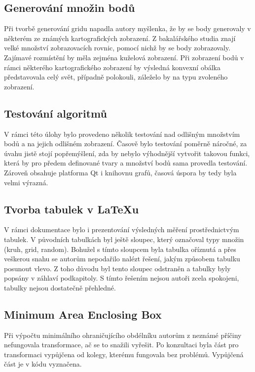 \documentclass[a4paper, 12pt]{article}
\begin{document}
\subsection{Generování množin bodů}
Při tvorbě generování gridu napadla autory myšlenka, že by se body generovaly v některém ze známých kartografických zobrazení. Z bakalářského studia znají velké množství zobrazovacích rovnic, pomocí nichž by se body zobrazovaly. Zajímavé rozmístění by měla zejména kuželová zobrazení. Při zobrazení bodů v rámci některého kartografického zobrazení by výsledná konvexní obálka představovala celý svět, případně polokouli, záleželo by na typu zvoleného zobrazení.

\subsection{Testování algoritmů}
V rámci této úlohy bylo provedeno několik testování nad odlišným množstvím bodů a na jejich odlišném zobrazení. Časově bylo testování poměrně náročné, za úvahu jistě stojí popřemýšlení, zda by nebylo výhodnější vytvořit takovou funkci, která by pro předem definované tvary a množství bodů sama provedla testování. Zároveň obsahuje platforma Qt i knihovnu grafů, časová úspora by tedy byla velmi výrazná.


\subsection{Tvorba tabulek v LaTeXu}
V rámci dokumentace bylo i prezentování výsledných měření prostřednictvým tabulek. V původních tabulkách byl ještě sloupec, který označoval typy množin (kruh, grid, random). Bohužel s tímto sloupcem byla tabulka oříznutá a přes veškerou snahu se autorům nepodařilo nalézt řešení, jakým způsobem tabulku posunout vlevo. Z toho důvodu byl tento sloupec odstraněn a tabulky byly popsány v záhlaví podkapitoly. S tímto řešením nejsou autoři zcela spokojeni, tabulky nejsou dostatečně přehledné. 

\subsection{Minimum Area Enclosing Box}
Při výpočtu minimálního ohraničujícího obdélníku autorům z neznámé příčiny nefungovala transformace, ač se to snažili vyřešit. Po konzultaci byla část pro transformaci vypůjčena od kolegy, kterému fungovala bez problémů. Vypůjčená část je v kódu vyznačena. 
\end{document}
